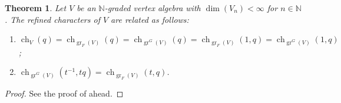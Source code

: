 \documentclass[a4paper, 12pt, reqno]{amsart}
\newtheorem{theorem}{Theorem}[section]
\theoremstyle{remark}
\DeclareMathOperator{\gr}{gr}
\DeclareMathOperator{\ch}{ch}
\begin{document}
\begin{theorem}
  \label{thr:49}
  Let $V$ be an $\mathbb{N}$-graded vertex algebra with $\dim(V_n) < \infty$ for $n \in \mathbb{N}$.
  The refined characters of $V$ are related as follows:
  \begin{enumerate}
  \item $\ch_V(q) = \ch_{\gr_F(V)}(q) = \ch_{\gr^G(V)}(q) = \ch_{\gr_F(V)}(1, q) = \ch_{\gr^G(V)}(1, q)$;
  \item $\ch_{\gr^G(V)}(t^{-1}, tq) = \ch_{\gr_F(V)}(t, q)$.
  \end{enumerate}
\end{theorem}

\begin{proof}
  See the proof of  ahead.
\end{proof}
\end{document}

